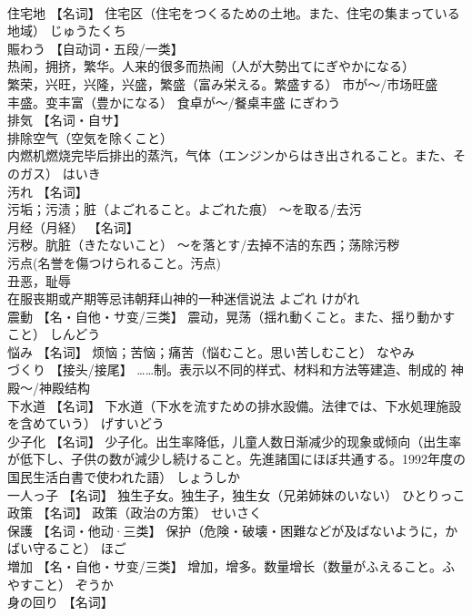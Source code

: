 \documentclass[8pt]{extreport}
\begin{document}
\begin{CJK}{UTF8}{min}
\\	住宅地	【名词】 住宅区（住宅をつくるための土地。また、住宅の集まっている地域）	じゅうたくち	
\\	賑わう	【自动词・五段/一类】 
\\	热闹，拥挤，繁华。人来的很多而热闹（人が大勢出てにぎやかになる） 
\\	繁荣，兴旺，兴隆，兴盛，繁盛（富み栄える。繁盛する） 市が～/市场旺盛 
\\	丰盛。变丰富（豊かになる） 食卓が～/餐桌丰盛	にぎわう	
\\	排気	【名词・自サ】 
\\	排除空气（空気を除くこと） 
\\	内燃机燃烧完毕后排出的蒸汽，气体（エンジンからはき出されること。また、そのガス）	はいき	
\\	汚れ	【名词】 
\\	污垢；污渍；脏（よごれること。よごれた痕） ～を取る/去污 
\\	月经（月経） 【名词】 
\\	污秽。肮脏（きたないこと） ～を落とす/去掉不洁的东西；荡除污秽 
\\	污点(名誉を傷つけられること。汚点) 
\\	丑恶，耻辱 
\\	在服丧期或产期等忌讳朝拜山神的一种迷信说法	よごれ けがれ	
\\	震動	【名・自他・サ变/三类】 震动，晃荡（揺れ動くこと。また、揺り動かすこと）	しんどう	
\\	悩み	【名词】 烦恼；苦恼；痛苦（悩むこと。思い苦しむこと）	なやみ	
\\	づくり	【接头/接尾】 ……制。表示以不同的样式、材料和方法等建造、制成的 神殿～/神殿结构		
\\	下水道	【名词】 下水道（下水を流すための排水設備。法律では、下水処理施設を含めていう）	げすいどう	
\\	少子化	【名词】 少子化。出生率降低，儿童人数日渐减少的现象或倾向（出生率が低下し、子供の数が減少し続けること。先進諸国にほぼ共通する。1992年度の国民生活白書で使われた語）	しょうしか	
\\	一人っ子	【名词】 独生子女。独生子，独生女（兄弟姉妹のいない）	ひとりっこ	
\\	政策	【名词】 政策（政治の方策）	せいさく	
\\	保護	【名词・他动·三类】 保护（危険・破壊・困難などが及ばないように，かばい守ること）	ほご	
\\	増加	【名・自他・サ变/三类】 增加，增多。数量增长（数量がふえること。ふやすこと）	ぞうか	
\\	身の回り	【名词】 

\end{CJK}
\end{document}
